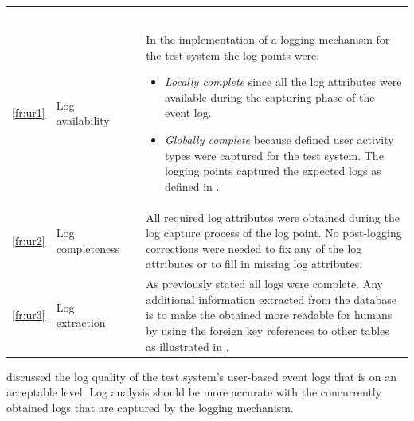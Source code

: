 \begin{xltabular}{\textwidth}{clcX}
	\caption[Logging quality assessment of the test system]{\textit{Logging quality assessment of the test system}}\label{tbl:ch3_testLoggingQuality}\\
	\toprule
	 &  &  &  \\
	\midrule
	\endfirsthead

	\caption[]{\continueCaption} \\
	\toprule
	 &  &  &  \\
	\midrule
	\endhead

	\midrule
	 \\ 
	\endfoot
	\endlastfoot

	\ref{fr:ur1} & Log availability & \cmark & \RaggedRight In the implementation of a logging mechanism for the test system the log points were:
		\begin{itemize}
			\item \textit{Locally complete} since all the log attributes were available during the capturing phase of the event log.
			\item \textit{Globally complete} because defined user activity types were captured for the test system. The logging points captured the expected logs as defined in .
		\end{itemize} \\
	\ref{fr:ur2} & Log completeness & \cmark & All required log attributes were obtained during the log capture process of the log point. No post-logging corrections were needed to fix any of the log attributes or to fill in missing log attributes. \\
	\ref{fr:ur3} & Log extraction & \cmark & As previously stated all logs were complete. Any additional information extracted from the database is to make the obtained more readable for humans by using the foreign key references to other tables as illustrated in . \\
	\bottomrule
\end{xltabular}

 discussed the log quality of the test system's user-based event logs that is on an acceptable level. Log analysis should be more accurate with the concurrently obtained logs that are captured by the logging mechanism.

